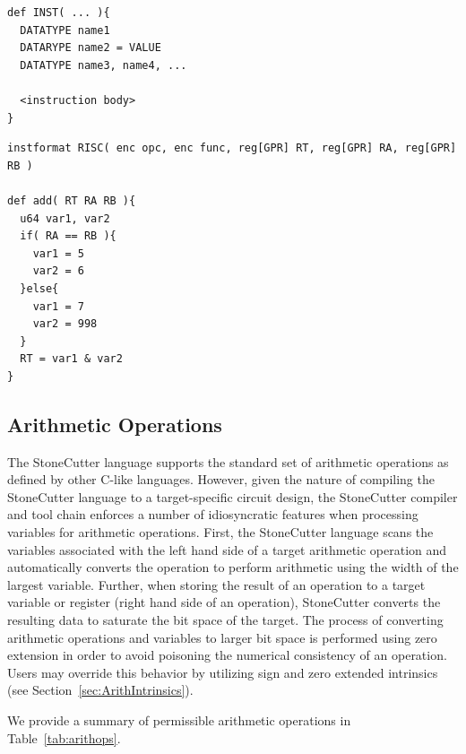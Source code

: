 \documentclass{article}
\begin{document}
\vspace{0.125in}
\begin{lstlisting}[frame=single,style=base,caption={Variable Definitions},captionpos=b,label={lis:vardefs}]
def INST( ... ){
  DATATYPE name1
  DATARYPE name2 = VALUE
  DATATYPE name3, name4, ...

  <instruction body>
}
\end{lstlisting}

\vspace{0.125in}
\begin{lstlisting}[frame=single,style=base,caption={Sample Variable Definitions},captionpos=b,label={lis:samplevardefs}]
instformat RISC( enc opc, enc func, reg[GPR] RT, reg[GPR] RA, reg[GPR] RB )

def add( RT RA RB ){
  u64 var1, var2
  if( RA == RB ){
    var1 = 5
    var2 = 6
  }else{
    var1 = 7
    var2 = 998
  }
  RT = var1 & var2
}
\end{lstlisting}

\clearpage
\subsection{Arithmetic Operations}
\label{sec:Arithmetic Operations}

The StoneCutter language supports the standard set of arithmetic operations as defined 
by other C-like languages.  However, given the nature of compiling the StoneCutter language 
to a target-specific circuit design, the StoneCutter compiler and tool chain enforces a number 
of idiosyncratic features when processing variables for arithmetic operations.  First, the StoneCutter 
language scans the variables associated with the left hand side of a target arithmetic operation and automatically 
converts the operation to perform arithmetic using the width of the largest variable.  Further, when 
storing the result of an operation to a target variable or register (right hand side of an operation), StoneCutter 
converts the resulting data to saturate the bit space of the target.  The process of converting 
arithmetic operations and variables to larger bit space is performed using zero extension in order to avoid 
poisoning the numerical consistency of an operation.  Users may override this behavior by utilizing 
sign and zero extended intrinsics (see Section~\ref{sec:ArithIntrinsics}).

We provide a summary of permissible arithmetic operations in Table~\ref{tab:arithops}.   
\end{document}
